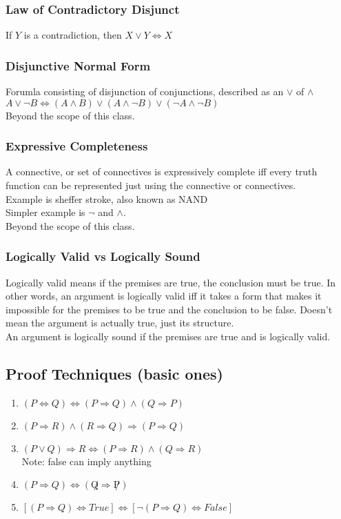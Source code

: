 \documentclass[11pt]{scrartcl}
\begin{document}
\subsubsection{Law of Contradictory Disjunct}
If $Y$ is a contradiction, then $X \lor Y \Leftrightarrow X$

\subsubsection{Disjunctive Normal Form}
Forumla consisting of disjunction of conjunctions, described as an $\lor$ of $\land$\\
$A \lor \lnot B \Leftrightarrow (A \land B)\lor(A \land \lnot B)\lor(\lnot A \land \lnot B)$\\
Beyond the scope of this class.
\subsubsection{Expressive Completeness}
A connective, or set of connectives is expressively complete iff every truth function can be represented just using the connective or connectives.\\
Example is sheffer stroke, also known as NAND\\ 
Simpler example is $\lnot$ and $\land$.\\
Beyond the scope of this class.
\subsubsection{Logically Valid vs Logically Sound}
Logically valid means if the premises are true, the conclusion must be true.
In other words, an argument is logically valid iff it takes a form that makes it impossible for the premises to be true and the conclusion to be false.
Doesn't mean the argument is actually true, just its structure.\\
An argument is logically sound if the premises are true and is logically valid.

\subsection{Proof Techniques (basic ones)}

\begin{enumerate}[i]
	\item $(P \Leftrightarrow Q) \Leftrightarrow (P \Rightarrow Q) \land (Q \Rightarrow P)$ 
	\item $(P \Rightarrow R) \land (R \Rightarrow Q) \Rightarrow (P \Rightarrow Q)$
	\item $(P \lor Q) \Rightarrow R \Leftrightarrow (P \Rightarrow R) \land (Q \Rightarrow R)$\\ Note: false can imply anything
	\item $(P \Rightarrow Q) \Leftrightarrow (\not Q \Rightarrow \not P)$
	\item $[(P \Rightarrow Q) \Leftrightarrow True] \Leftrightarrow [\lnot (P \Rightarrow Q) \Leftrightarrow False]$
\end{enumerate}
\end{document}
